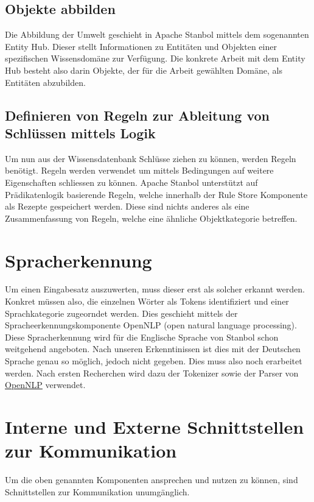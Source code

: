 \subsection{Objekte abbilden}
\label{subsec:architektur_wissensdatenbank_Objekte}
Die Abbildung der Umwelt geschieht in Apache Stanbol mittels dem sogenannten Entity Hub.
Dieser stellt Informationen zu Entitäten und Objekten einer spezifischen Wissensdomäne zur Verfügung. Die konkrete Arbeit mit dem Entity Hub besteht also darin Objekte, der für die Arbeit gewählten Domäne, als Entitäten abzubilden.
\subsection{Definieren von Regeln zur Ableitung von Schlüssen mittels Logik}
\label{sec:architektur_regeln}
Um nun aus der Wissensdatenbank Schlüsse ziehen zu können, werden Regeln benötigt. Regeln werden verwendet um mittels Bedingungen auf weitere Eigenschaften schliessen zu können.
Apache Stanbol unterstützt auf Prädikatenlogik basierende Regeln, welche innerhalb der Rule Store Komponente als Rezepte gespeichert werden. Diese sind nichts anderes als eine Zusammenfassung von Regeln, welche eine ähnliche Objektkategorie betreffen.

\section{Spracherkennung}
\label{sec:architektur_spracherkennung}
Um einen Eingabesatz auszuwerten, muss dieser erst als solcher erkannt werden. Konkret müssen also, die einzelnen Wörter als Tokens identifiziert und einer Sprachkategorie zugeorndet werden. Dies geschieht mittels der Spracheerkennungskomponente OpenNLP (open natural language processing). Diese Spracherkennung wird für die Englische Sprache von Stanbol schon weitgehend angeboten. Nach unseren Erkenntinissen ist dies mit der Deutschen Sprache genau so möglich, jedoch nicht gegeben. Dies muss also noch erarbeitet werden. Nach ersten Recherchen wird dazu der Tokenizer sowie der Parser von \href{http://opennlp.sourceforge.net/models-1.5/}{OpenNLP} verwendet.

\section{Interne und Externe Schnittstellen zur Kommunikation}
\label{sec:architektur_schnittstellen}
Um die oben genannten Komponenten ansprechen und nutzen zu können, sind Schnittstellen zur Kommunikation unumgänglich.

